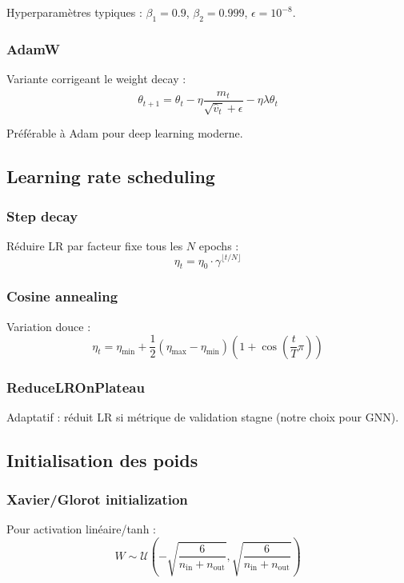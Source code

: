 Hyperparamètres typiques : $\beta_1 = 0.9$, $\beta_2 = 0.999$, $\epsilon = 10^{-8}$.

\subsubsection{AdamW}

Variante corrigeant le weight decay :
\[
\theta_{t+1} = \theta_t - \eta \frac{\hat{m}_t}{\sqrt{\hat{v}_t} + \epsilon} - \eta \lambda \theta_t
\]

Préférable à Adam pour deep learning moderne.

\subsection{Learning rate scheduling}

\subsubsection{Step decay}

Réduire LR par facteur fixe tous les $N$ epochs :
\[
\eta_t = \eta_0 \cdot \gamma^{\lfloor t/N \rfloor}
\]

\subsubsection{Cosine annealing}

Variation douce :
\[
\eta_t = \eta_{\min} + \frac{1}{2}(\eta_{\max} - \eta_{\min})\left(1 + \cos\left(\frac{t}{T}\pi\right)\right)
\]

\subsubsection{ReduceLROnPlateau}

Adaptatif : réduit LR si métrique de validation stagne (notre choix pour GNN).

\subsection{Initialisation des poids}

\subsubsection{Xavier/Glorot initialization}

Pour activation linéaire/tanh :
\[
W \sim \mathcal{U}\left(-\sqrt{\frac{6}{n_{\text{in}} + n_{\text{out}}}}, \sqrt{\frac{6}{n_{\text{in}} + n_{\text{out}}}}\right)
\]


